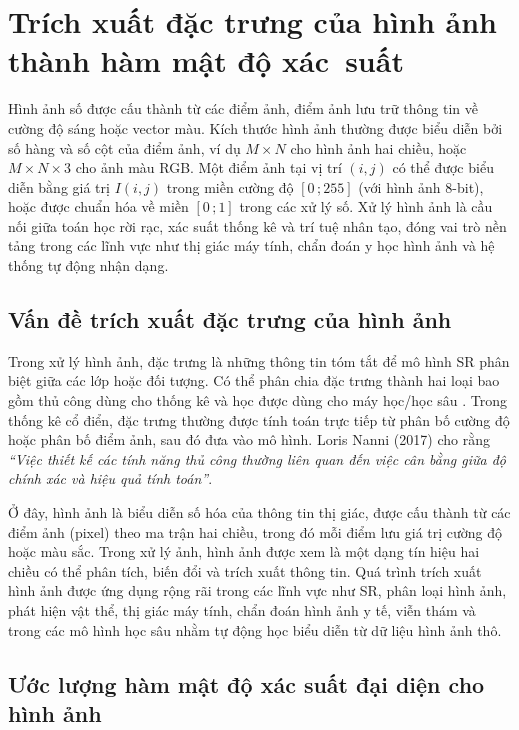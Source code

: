 \documentclass[a4paper,oneside]{book} %
\theoremstyle{plain}
\theoremstyle{plain}
\theoremstyle{nonumberplain}
\begin{document}
\section{Trích xuất đặc trưng của hình ảnh thành hàm mật độ xác~suất}

Hình ảnh số được cấu thành từ các điểm ảnh, điểm ảnh lưu trữ thông tin về cường độ sáng hoặc vector màu. Kích thước hình ảnh thường được biểu diễn bởi số hàng và số cột của điểm ảnh, ví dụ $M\times N$ cho hình ảnh hai chiều, hoặc $M\times N\times 3$ cho ảnh màu RGB. Một điểm ảnh tại vị trí $(i,j)$ có thể được biểu diễn bằng giá trị $I(i,j)$ trong miền cường độ $[0\,;255]$ (với hình ảnh 8-bit), hoặc được chuẩn hóa về miền $[0\,;1]$ trong các xử lý số. Xử lý hình ảnh là cầu nối giữa toán học rời rạc, xác suất thống kê và trí tuệ nhân tạo, đóng vai trò nền tảng trong các lĩnh vực như thị giác máy tính, chẩn đoán y học hình ảnh và hệ thống tự động nhận dạng.

\subsection{Vấn đề trích xuất đặc trưng của hình ảnh}

Trong xử lý hình ảnh, đặc trưng là những thông tin tóm tắt để mô hình SR phân biệt giữa các lớp hoặc đối tượng. Có thể phân chia đặc trưng thành hai loại bao gồm thủ công dùng cho thống kê và học được dùng cho máy học/học sâu \cite{nanni2017handcrafted}. Trong thống kê cổ điển, đặc trưng thường được tính toán trực tiếp từ phân bố cường độ hoặc phân bố điểm ảnh, sau đó đưa vào mô hình. Loris Nanni (2017) \cite{nanni2017handcrafted} cho rằng \emph{``Việc thiết kế các tính năng thủ công thường liên quan đến việc cân bằng giữa độ chính xác và hiệu quả tính toán''}.

Ở đây, hình ảnh là biểu diễn số hóa của thông tin thị giác, được cấu thành từ các điểm ảnh (pixel) theo ma trận hai chiều, trong đó mỗi điểm lưu giá trị cường độ hoặc màu sắc. Trong xử lý ảnh, hình ảnh được xem là một dạng tín hiệu hai chiều có thể phân tích, biến đổi và trích xuất thông tin. Quá trình trích xuất hình ảnh được ứng dụng rộng rãi trong các lĩnh vực như SR, phân loại hình ảnh, phát hiện vật thể, thị giác máy tính, chẩn đoán hình ảnh y tế, viễn thám và trong các mô hình học sâu nhằm tự động học biểu diễn từ dữ liệu hình ảnh thô.



\subsection{Ước lượng hàm mật độ xác suất đại diện cho hình ảnh}
\end{document}
